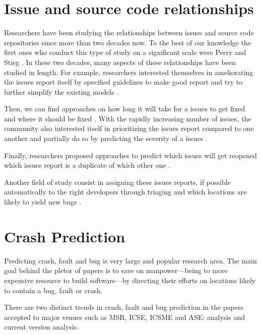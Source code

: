 \section{Issue and source code relationships\label{rel:issue-rela}}

Researchers have been studying the relationships between issues and source code repositories since more than two decades now.
To the best of our knowledge the first ones who conduct this type of study on a significant scale were Perry and Stieg \cite{PerryDewayneE.1993}.
In these two decades, many aspects of these relationships have been studied in length.
For example, researchers  interested themselves in ameliorating the issues report itself by specified guidelines to make good report \cite{Bettenburg2008} and try to further simplify the existing models \cite{Herraiz2008}.

Then, we can find approaches on how long it will take for a issues to get fixed \cite{Bhattacharya2011,Zhang2013,Saha2014} and where it should be fixed \cite{Zhou2012,Kim2013a}.
With the rapidly increasing number of issues, the community also interested itself in prioritizing the issues report compared to one another \cite{Kim2011c} and partially do so by predicting the severity of a issues \cite{Lamkanfi2010}.

Finally, researchers proposed approaches to predict which issues will get reopened \cite{Zimmermann2012,Lo2013} which issues report is a duplicate of which other one \cite{Jalbert2008,Bettenburg2008a,Tian2012a}.

Another field of study consist in assigning these issues reports, if possible automatically to the right developers through triaging  \cite{Anvik2006,Jeong2009,Tamrawi2011a,Bortis2013}
and which locations are likely to yield new bugs \cite{Kim2006,Kim2007}.

\section{Crash Prediction}

Predicting crash, fault and bug is very large and popular research area.
The main goal behind the pletor of papers is to save on manpower---being to more expensive resource to build software---by directing their efforts on locations likely to contain a bug, fault or crash.

There are two distinct trends in crash, fault and bug prediction in the papers accepted to major venues such as MSR, ICSE, ICSME and ASE:  analysis and current version analysis.

